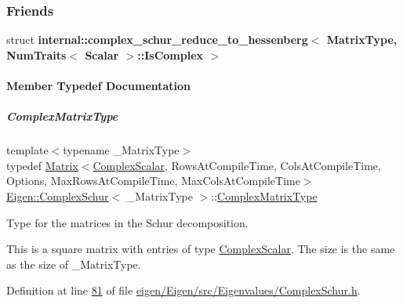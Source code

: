 \subsubsection*{Friends}
\begin{DoxyCompactItemize}
\item 
\mbox{\label{group___eigenvalues___module_ad25f2162da857c1114ed0383648a7728}} 
struct {\bfseries internal\+::complex\+\_\+schur\+\_\+reduce\+\_\+to\+\_\+hessenberg$<$ Matrix\+Type, Num\+Traits$<$ Scalar $>$\+::\+Is\+Complex $>$}
\end{DoxyCompactItemize}


\paragraph{Member Typedef Documentation}
\mbox{\label{group___eigenvalues___module_af61fe57877d51cfb50178f78534042f0}} 
\subparagraph{\texorpdfstring{Complex\+Matrix\+Type}{ComplexMatrixType}\hspace{0.1cm}{\footnotesize\ttfamily [1/2]}}
{\footnotesize\ttfamily template$<$typename \+\_\+\+Matrix\+Type$>$ \\
typedef \hyperlink{group___core___module_class_eigen_1_1_matrix}{Matrix}$<$\hyperlink{group___eigenvalues___module_ae1a4713b53f821867fbad617e426832a}{Complex\+Scalar}, Rows\+At\+Compile\+Time, Cols\+At\+Compile\+Time, Options, Max\+Rows\+At\+Compile\+Time, Max\+Cols\+At\+Compile\+Time$>$ \hyperlink{group___eigenvalues___module_class_eigen_1_1_complex_schur}{Eigen\+::\+Complex\+Schur}$<$ \+\_\+\+Matrix\+Type $>$\+::\hyperlink{group___eigenvalues___module_af61fe57877d51cfb50178f78534042f0}{Complex\+Matrix\+Type}}



Type for the matrices in the Schur decomposition. 

This is a square matrix with entries of type \hyperlink{group___eigenvalues___module_ae1a4713b53f821867fbad617e426832a}{Complex\+Scalar}. The size is the same as the size of {\ttfamily \+\_\+\+Matrix\+Type}. 

Definition at line \hyperlink{eigen_2_eigen_2src_2_eigenvalues_2_complex_schur_8h_source_l00081}{81} of file \hyperlink{eigen_2_eigen_2src_2_eigenvalues_2_complex_schur_8h_source}{eigen/\+Eigen/src/\+Eigenvalues/\+Complex\+Schur.\+h}.

